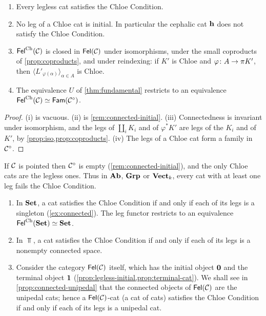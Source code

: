 \begin{proposition}\label{prop:chloe-basic}
\begin{enumerate}
\item Every legless cat satisfies the Chloe Condition.
\item No leg of a Chloe cat is initial. In particular the cephalic cat
  $\mathbf{h}$ does not satisfy the Chloe Condition.
\item $\mathsf{Fel}^{\mathrm{Ch}}(\mathcal{C})$ is closed in $\mathsf{Fel}(\mathcal{C})$ under isomorphisms, under the
  small coproducts of \cref{prop:coproducts}, and under reindexing: if $K'$ is
  Chloe and $\varphi\colon A\to\pi K'$, then
  $\langle L'_{\varphi(\alpha)}\rangle_{\alpha\in A}$ is Chloe.
\item The equivalence $U$ of \cref{thm:fundamental} restricts to an equivalence
  $\mathsf{Fel}^{\mathrm{Ch}}(\mathcal{C})\simeq\mathsf{Fam}(\mathcal{C}^\circ)$.
\end{enumerate}
\end{proposition}

\begin{proof}
(i) is vacuous. (ii) is \cref{rem:connected-initial}. (iii) Connectedness is
invariant under isomorphism, and the legs of $\coprod_iK_i$ and of $\varphi^*K'$
are legs of the $K_i$ and of $K'$, by \cref{prop:iso,prop:coproducts}. (iv) The legs of a Chloe cat form a family
in $\mathcal{C}^\circ$.
\end{proof}

\begin{remark}\label{rem:pointed-no-chloe}
If $\mathcal{C}$ is pointed then $\mathcal{C}^\circ$ is empty (\cref{rem:connected-initial}),
and the only Chloe cats are the legless ones. Thus in $\mathbf{Ab}$, $\mathbf{Grp}$ or
$\mathbf{Vect}_k$, every cat with at least one leg fails the Chloe Condition.
\end{remark}

\begin{example}\label{ex:chloe}
\begin{enumerate}
\item In $\mathbf{Set}$, a cat satisfies the Chloe Condition if and only if each of its
  legs is a singleton (\cref{ex:connected}). The leg functor restricts to an
  equivalence $\mathsf{Fel}^{\mathrm{Ch}}(\mathbf{Set})\simeq\mathbf{Set}$.
\item In $\Top$, a cat satisfies the Chloe Condition if and only if each of its
  legs is a nonempty connected space.
\item Consider the category $\mathsf{Fel}(\mathcal{C})$ itself, which has the initial object
  $\mathbf{0}$ and the terminal object $\mathbf{1}$ (\cref{prop:legless-initial,prop:terminal-cat}).
  We shall see in \cref{prop:connected-unipedal} that the connected objects of
  $\mathsf{Fel}(\mathcal{C})$ are the unipedal cats; hence a $\mathsf{Fel}(\mathcal{C})$-cat (a cat of cats)
  satisfies the Chloe Condition if and only if each of its legs is a unipedal
  cat.
\end{enumerate}
\end{example}

